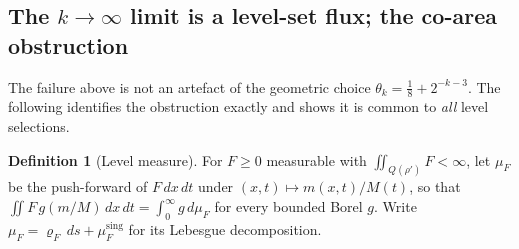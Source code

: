 \documentclass[11pt]{article}
\theoremstyle{definition}
\newtheorem{definition}[theorem]{Definition}
\theoremstyle{remark}
\begin{document}
\subsection{The $k\to\infty$ limit is a level-set flux; the co-area
obstruction}
\label{subsec:s41-coarea}

The failure above is not an artefact of the geometric choice
$\theta_k=\tfrac18+2^{-k-3}$. The following identifies the obstruction
exactly and shows it is common to \emph{all} level selections.

\begin{definition}[Level measure]\label{def:s41-levelmeasure}
  For $F\geq0$ measurable with $\iint_{Q(\rho')}F<\infty$, let $\mu_F$ be
  the push-forward of $F\,dx\,dt$ under
  $(x,t)\mapsto m(x,t)/M(t)$, so that
  $\iint F\,g(m/M)\,dx\,dt=\int_0^\infty g\,d\mu_F$ for every bounded Borel
  $g$. Write $\mu_F=\varrho_F\,ds+\mu_F^{\mathrm{sing}}$ for its Lebesgue
  decomposition.
\end{definition}
\end{document}
